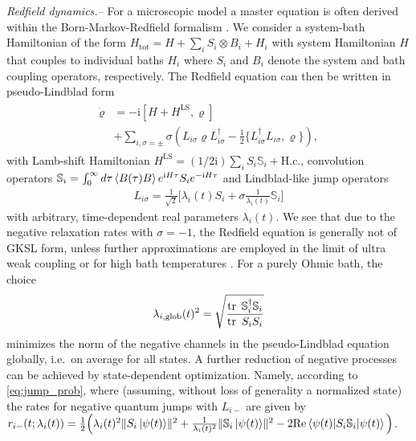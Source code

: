 \documentclass[twocolumn,prl,superscriptaddress]{revtex4-2}
\renewcommand{\i}{\mathrm i}
\begin{document}
\textit{Redfield dynamics.--} For a microscopic model a master equation is often derived within the Born-Markov-Redfield formalism \cite{Strunz20,Archak22}. We consider a system-bath Hamiltonian of the form $H_\mathrm{tot} = H + \sum_i S_i \otimes B_i + H_i$ with system Hamiltonian $H$ that couples to individual baths $H_i$ where $S_i$ and $B_i$ denote the system and bath coupling operators, respectively. The Redfield equation can then be written in pseudo-Lindblad form \cite{TBecker2021}
\begin{align}
	\begin{aligned}
		\dot \varrho &= - \i[H + H^{\mathrm{LS}}, \varrho] \\ &+  \sum\limits_{i,\sigma=\pm} \sigma \left( L_{i\sigma} \varrho L_{i\sigma}^\dagger - \frac{1}{2} \{ L_{i\sigma}^\dagger L_{i\sigma},\varrho \} \right) ,
	\end{aligned}
\end{align}
with Lamb-shift Hamiltonian $H^\mathrm{LS}= (1/2\i) \sum_i S_i\mathbb{S}_i + \text{H.c.}$, convolution operators $\mathbb{S}_i=\int_0^\infty  d \tau \expval{B(\tau)B} e^{\mathrm{i}H \tau} S_i e^{-\i H \tau}$ and Lindblad-like jump operators
\begin{align}
	L_{i\sigma} = \frac{1}{\sqrt 2} \Bigg[ \lambda_{i}(t) S_i + \sigma \frac{1}{\lambda_{i}(t)} \mathbb{S}_i \Bigg]
\end{align} 
with arbitrary, time-dependent real parameters $\lambda_{i}(t)$.
We see that due to the negative relaxation rates with $\sigma=-1$, the Redfield equation is generally not of GKSL form, unless further approximations are employed in the limit of ultra weak coupling \cite{breuerpetruccione,Archak22,Strunz20} or for high bath temperatures \cite{HWichterich2007,TBecker2021}. 
For a purely Ohmic bath, the choice~\cite{TBecker2021}
\begin{align}
	\lambda_{i, \mathrm{glob}}(t)^2 = \sqrt \frac{\tr\ \mathbb{S}_i^\dagger \mathbb{S}_i}{\tr\ S_i S_i}
\end{align}
minimizes the norm of the negative channels in the pseudo-Lindblad equation globally, i.e.~on average for all states. A further reduction of negative processes can be achieved by state-dependent optimization. Namely, according to \cref{eq:jump_prob}, where (assuming, without loss of generality a normalized state) the rates for negative quantum jumps with $L_{i-}$ are given by $	r_{i-}(t;\lambda_i(t)) = \frac{1}{2} \Big( \lambda_i(t)^2 \lVert S_i \ket{\psi(t)}\rVert^2 + \frac{1}{\lambda_i(t)^2} \lVert \mathbb{S}_i \ket{\psi(t)}\rVert^2 - 2\mathrm{Re} \expval{S_i \mathbb{S}_i}{\psi(t)}  \Big)$.
\end{document}
